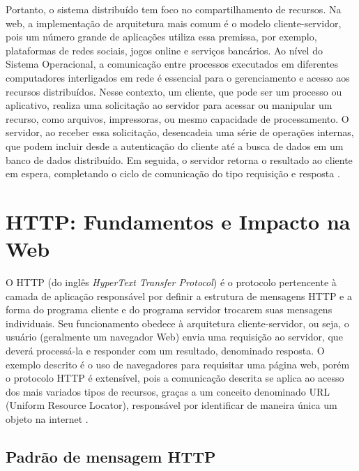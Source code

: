 Portanto, o sistema distribuído tem foco no compartilhamento de recursos. Na web, a implementação de arquitetura mais comum é o modelo cliente-servidor, pois
um número grande de aplicações utiliza essa premissa, por exemplo, plataformas de redes sociais, jogos online e serviços bancários.
Ao nível do Sistema Operacional, a comunicação entre processos executados em diferentes computadores interligados em rede é essencial para o gerenciamento e acesso aos recursos distribuídos.
Nesse contexto, um cliente, que pode ser um processo ou aplicativo, realiza uma solicitação ao servidor para acessar ou manipular um recurso, como arquivos, impressoras, ou mesmo capacidade de processamento. O servidor, 
ao receber essa solicitação, desencadeia uma série de operações internas, que podem incluir desde a autenticação do cliente até a busca de dados em um banco de dados distribuído. Em seguida, o servidor 
retorna o resultado ao cliente em espera, completando o ciclo de comunicação do tipo requisição e resposta \cite[pp. 16]{sistemas-distribuidos-coulouris2013}.

\section{HTTP: Fundamentos e Impacto na Web}

O HTTP (do inglês \textit{HyperText Transfer Protocol}) é o protocolo pertencente à camada de aplicação
responsável por definir a estrutura de mensagens HTTP e a forma do programa cliente e do programa servidor 
trocarem suas mensagens individuais. Seu funcionamento obedece à arquitetura cliente-servidor, ou seja, o
usuário (geralmente um navegador Web) envia uma requisição ao servidor, que deverá processá-la e responder 
com um resultado, denominado resposta. O exemplo descrito é o uso de navegadores para requisitar uma página web, porém 
o protocolo HTTP é extensível, pois a comunicação descrita se aplica ao acesso dos mais variados tipos de recursos, graças a
um conceito denominado URL (Uniform Resource Locator), responsável por identificar de maneira única um objeto na internet \cite[pp. 72]{redes-kurose2010}.

\subsection{Padrão de mensagem HTTP}

